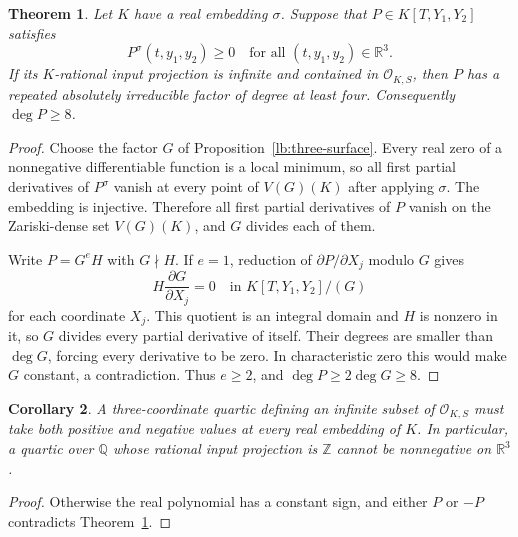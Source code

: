 \documentclass[11pt,a4paper]{article}
\newtheorem{theorem}{Theorem}[section]
\newtheorem{corollary}[theorem]{Corollary}
\theoremstyle{definition}
\newcommand{\OKS}{\mathcal O_{K,S}}
\begin{document}
\begin{theorem}\label{lb:nonnegative-eight}
Let $K$ have a real embedding $\sigma$. Suppose that
$P\in K[T,Y_1,Y_2]$ satisfies
\[
             P^\sigma(t,y_1,y_2)\ge0
                  \quad\text{for all }(t,y_1,y_2)\in\mathbb R^3.
\]
If its $K$-rational input projection is infinite and contained
in $\OKS$, then $P$ has a repeated absolutely irreducible factor
of degree at least four. Consequently $\deg P\ge8$.
\end{theorem}
\begin{proof}
Choose the factor $G$ of Proposition~\ref{lb:three-surface}.
Every real zero of a nonnegative differentiable function is a
local minimum, so all first partial derivatives of $P^\sigma$
vanish at every point of $V(G)(K)$ after applying $\sigma$.
The embedding is injective. Therefore all first partial
derivatives of $P$ vanish on the Zariski-dense set $V(G)(K)$,
and $G$ divides each of them.

Write $P=G^eH$ with $G\nmid H$. If $e=1$, reduction of
$\partial P/\partial X_j$ modulo $G$ gives
\[
               H\frac{\partial G}{\partial X_j}=0
                    \quad\text{in }K[T,Y_1,Y_2]/(G)
\]
for each coordinate $X_j$. This quotient is an integral domain
and $H$ is nonzero in it, so $G$ divides every partial derivative
of itself. Their degrees are smaller than $\deg G$, forcing
every derivative to be zero. In characteristic zero this would
make $G$ constant, a contradiction. Thus $e\ge2$, and
$\deg P\ge2\deg G\ge8$.
\end{proof}

\begin{corollary}\label{lb:quartic-sign}
A three-coordinate quartic defining an infinite subset of
$\OKS$ must take both positive and negative values at every
real embedding of $K$. In particular, a quartic over $\mathbb Q$
whose rational input projection is $\mathbb Z$ cannot be
nonnegative on $\mathbb R^3$.
\end{corollary}
\begin{proof}
Otherwise the real polynomial has a constant sign, and either
$P$ or $-P$ contradicts Theorem~\ref{lb:nonnegative-eight}.
\end{proof}
\end{document}
